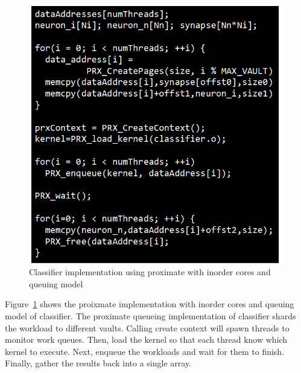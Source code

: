 \begin{figure}
  \begin{center}
    \includegraphics[width=\linewidth]{cs758-figs/classifier-prx_inorder_q.png}
  \end{center}
\vspace{-0.2in}
  \caption{Classifier implementation using proximate with inorder cores and queuing model}
  \label{fig:classifier-prx_inorder_q}
\vspace{-0.05in}
\end{figure}

Figure~\ref{fig:classifier-prx_inorder_q} shows the proixmate implementation 
with inorder cores and queuing model of classifier. The proximate queueing implementation of classifier shards the 
workload to different vaults. Calling create context 
will spawn threads to monitor work queues. Then, load the kernel so that each thread
know which kernel to execute. Next, enqueue the workloads and wait for them to finish. 
Finally, gather the results back into a single array. 



